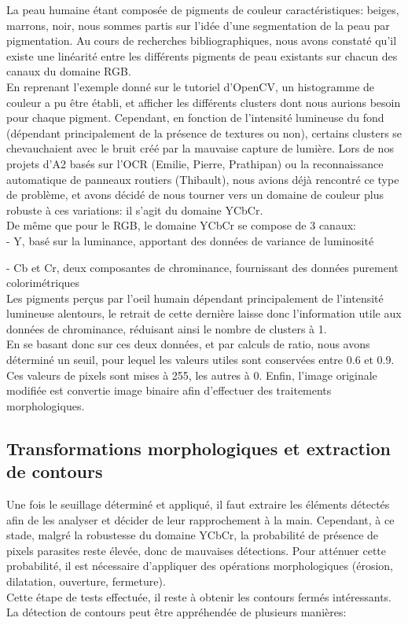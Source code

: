 \documentclass[10pt,a4paper]{report}
\begin{document}
La peau humaine étant composée de pigments de couleur caractéristiques: beiges, marrons, noir, nous sommes partis sur l'idée d'une segmentation de la peau par pigmentation. Au cours de recherches bibliographiques, nous avons constaté qu'il existe une linéarité entre les différents pigments de peau existants sur chacun des canaux du domaine RGB.\\
\newline En reprenant l'exemple donné sur le tutoriel d'OpenCV, un histogramme de couleur a pu être établi, et afficher les différents clusters dont nous aurions besoin pour chaque pigment. Cependant, en fonction de l'intensité lumineuse du fond (dépendant principalement de la présence de textures ou non), certains clusters se chevauchaient avec le bruit créé par la mauvaise capture de lumière. Lors de nos projets d'A2 basés sur l'OCR (Emilie, Pierre, Prathipan) ou la reconnaissance automatique de panneaux routiers (Thibault), nous avions déjà rencontré ce type de problème, et avons décidé de nous tourner vers un domaine de couleur plus robuste à ces variations: il s'agit du domaine YCbCr.\\
De même que pour le RGB, le domaine YCbCr se compose de 3 canaux:\\

- Y, basé sur la luminance, apportant des données de variance de luminosité

- Cb et Cr, deux composantes de chrominance, fournissant des données purement colorimétriques\\
\newline
Les pigments perçus par l'oeil humain dépendant principalement de l'intensité lumineuse alentours, le retrait de cette dernière laisse donc l'information utile aux données de chrominance, réduisant ainsi le nombre de clusters à 1.\\
En se basant donc sur ces deux données, et par calculs de ratio, nous avons déterminé un seuil, pour lequel les valeurs utiles sont conservées entre 0.6 et 0.9. Ces valeurs de pixels sont mises à 255, les autres à 0. Enfin, l'image originale modifiée est convertie image binaire afin d'effectuer des traitements morphologiques.

\subsection{Transformations morphologiques et extraction de contours}
Une fois le seuillage déterminé et appliqué, il faut extraire les éléments détectés afin de les analyser et décider de leur rapprochement à la main. Cependant, à ce stade, malgré la robustesse du domaine YCbCr, la probabilité de présence de pixels parasites reste élevée, donc de mauvaises détections. Pour atténuer cette probabilité, il est nécessaire d'appliquer des opérations morphologiques (érosion, dilatation, ouverture, fermeture).\\
Cette étape de tests effectuée, il reste à obtenir les contours fermés intéressants. La détection de contours peut être appréhendée de plusieurs manières:\\
\end{document}
